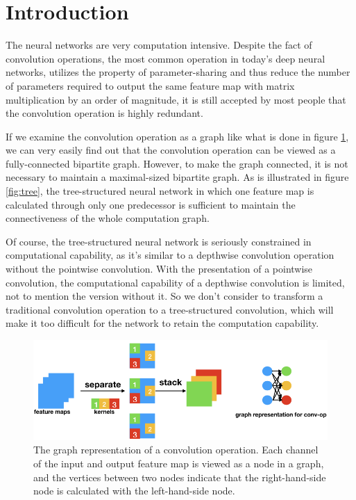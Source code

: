 \documentclass{acmtog} %
\begin{document}
\section{Introduction}

The neural networks are very computation intensive. Despite the fact of convolution operations, the most common operation in today's deep neural networks, utilizes the property of parameter-sharing and thus reduce the number of parameters required to output the same feature map with matrix multiplication by an order of magnitude, it is still accepted by most people that the convolution operation is highly redundant.

If we examine the convolution operation as a graph like what is done in figure \ref{fig:conv}, we can very easily find out that the convolution operation can be viewed as a fully-connected bipartite graph. However, to make the graph connected, it is not necessary to maintain a maximal-sized bipartite graph. As is illustrated in figure \ref{fig:tree}, the tree-structured neural network in which one feature map is calculated through only one predecessor is sufficient to maintain the connectiveness of the whole computation graph. 

Of course, the tree-structured neural network is seriously constrained in computational capability, as it's similar to a depthwise convolution operation without the pointwise convolution. With the presentation of a pointwise convolution, the computational capability of a depthwise convolution is limited, not to mention the version without it. So we don't consider to transform a traditional convolution operation to a tree-structured convolution, which will make it too difficult for the network to retain the computation capability.

\begin{figure}
\centering
\includegraphics[width=1\linewidth]{assets/conv.png}
\caption{The graph representation of a convolution operation. Each channel of the input and output feature map is viewed as a node in a graph, and the vertices between two nodes indicate that the right-hand-side node is calculated with the left-hand-side node.}
\label{fig:conv}
\end{figure}
\end{document}
